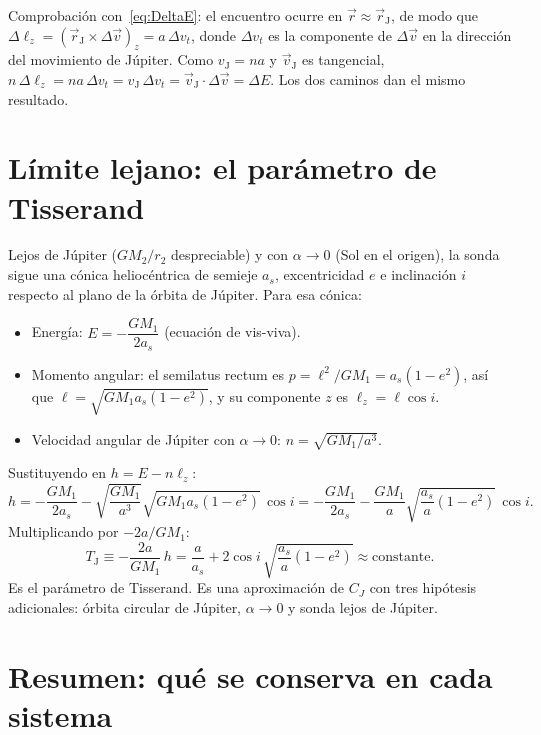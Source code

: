 \documentclass[12pt,letterpaper]{article}
\begin{document}
Comprobación con~\eqref{eq:DeltaE}: el encuentro ocurre en $\vec r \approx \vec r_{\mathrm J}$, de modo
que $\Delta\ell_z = (\vec r_{\mathrm J}\times\Delta\vec v)_z = a\,\Delta v_t$, donde $\Delta v_t$ es la
componente de $\Delta\vec v$ en la dirección del movimiento de Júpiter. Como $v_{\mathrm J} = n a$ y
$\vec v_{\mathrm J}$ es tangencial,
$n\,\Delta\ell_z = n a\,\Delta v_t = v_{\mathrm J}\,\Delta v_t = \vec v_{\mathrm J}\cdot\Delta\vec v = \Delta E$.
Los dos caminos dan el mismo resultado.

\section{Límite lejano: el parámetro de Tisserand}

Lejos de Júpiter ($GM_2/r_2$ despreciable) y con $\alpha\to 0$ (Sol en el origen), la sonda sigue una
cónica heliocéntrica de semieje $a_s$, excentricidad $e$ e inclinación $i$ respecto al plano de
la órbita de Júpiter. Para esa cónica:
\begin{itemize}
\item Energía: $E = -\dfrac{GM_1}{2a_s}$ (ecuación de vis-viva).
\item Momento angular: el semilatus rectum es $p = \ell^2/GM_1 = a_s(1-e^2)$, así que
$\ell = \sqrt{GM_1 a_s(1-e^2)}$, y su componente $z$ es $\ell_z = \ell\cos i$.
\item Velocidad angular de Júpiter con $\alpha\to 0$: $n = \sqrt{GM_1/a^3}$.
\end{itemize}
Sustituyendo en $h = E - n\ell_z$:
\[
h = -\frac{GM_1}{2a_s} - \sqrt{\frac{GM_1}{a^3}}\sqrt{GM_1 a_s(1-e^2)}\,\cos i
  = -\frac{GM_1}{2a_s} - \frac{GM_1}{a}\sqrt{\frac{a_s}{a}(1-e^2)}\,\cos i .
\]
Multiplicando por $-2a/GM_1$:
\begin{equation}
T_{\mathrm J} \equiv -\frac{2a}{GM_1}\,h = \frac{a}{a_s} + 2\cos i\,\sqrt{\frac{a_s}{a}\left(1-e^2\right)}
\approx \text{constante}.
\label{eq:T_J}
\end{equation}
Es el parámetro de Tisserand. Es una aproximación de $C_J$ con tres hipótesis adicionales:
órbita circular de Júpiter, $\alpha\to 0$ y sonda lejos de Júpiter.

\section{Resumen: qué se conserva en cada sistema}
\end{document}
